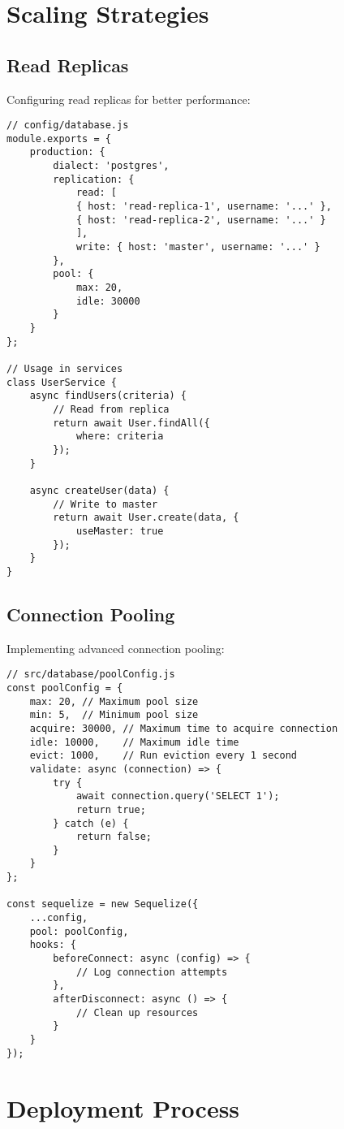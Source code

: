 \documentclass[12pt,a4paper]{book}
\begin{document}
	\section{Scaling Strategies}
	
	\subsection{Read Replicas}
	Configuring read replicas for better performance:
	
	\begin{verbatim}
// config/database.js
module.exports = {
	production: {
		dialect: 'postgres',
		replication: {
			read: [
			{ host: 'read-replica-1', username: '...' },
			{ host: 'read-replica-2', username: '...' }
			],
			write: { host: 'master', username: '...' }
		},
		pool: {
			max: 20,
			idle: 30000
		}
	}
};

// Usage in services
class UserService {
	async findUsers(criteria) {
		// Read from replica
		return await User.findAll({
			where: criteria
		});
	}
	
	async createUser(data) {
		// Write to master
		return await User.create(data, {
			useMaster: true
		});
	}
}
	\end{verbatim}
	
	\subsection{Connection Pooling}
	Implementing advanced connection pooling:
	
	\begin{verbatim}
// src/database/poolConfig.js
const poolConfig = {
	max: 20, // Maximum pool size
	min: 5,  // Minimum pool size
	acquire: 30000, // Maximum time to acquire connection
	idle: 10000,    // Maximum idle time
	evict: 1000,    // Run eviction every 1 second
	validate: async (connection) => {
		try {
			await connection.query('SELECT 1');
			return true;
		} catch (e) {
			return false;
		}
	}
};

const sequelize = new Sequelize({
	...config,
	pool: poolConfig,
	hooks: {
		beforeConnect: async (config) => {
			// Log connection attempts
		},
		afterDisconnect: async () => {
			// Clean up resources
		}
	}
});
	\end{verbatim}
	
	\section{Deployment Process}
	
\end{document}
